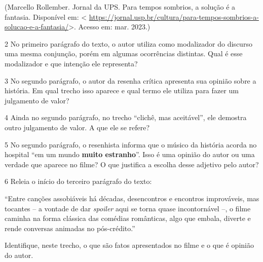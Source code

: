 (Marcello Rollember. Jornal da UPS. Para tempos sombrios, a solução é a
fantasia. Disponível em: \textless{}
\url{https://jornal.usp.br/cultura/para-tempos-sombrios-a-solucao-e-a-fantasia/}\textgreater.
Acesso em: mar. 2023.)

\num{2} No primeiro parágrafo do texto, o autor utiliza como modalizador
do discurso uma mesma conjunção, porém em algumas ocorrências distintas.
Qual é esse modalizador e que intenção ele representa?



\num{3} No segundo parágrafo, o autor da resenha crítica apresenta sua
opinião sobre a história. Em qual trecho isso aparece e qual termo ele
utiliza para fazer um julgamento de valor?



\num{4} Ainda no segundo parágrafo, no trecho ``clichê, mas aceitável'',
ele demostra outro julgamento de valor. A que ele se refere?



\num{5} No segundo parágrafo, o resenhista informa que o músico da
história acorda no hospital ``em um mundo \textbf{muito estranho}''.
Isso é uma opinião do autor ou uma verdade que aparece no filme? O que
justifica a escolha desse adjetivo pelo autor?



\num{6} Releia o início do terceiro parágrafo do texto:

``Entre canções assobiáveis há décadas, desencontros e encontros
improváveis, mas tocantes -- a vontade de dar \emph{spoiler} aqui se
torna quase incontornável --, o filme caminha na forma clássica das
comédias românticas, algo que embala, diverte e rende conversas animadas
no pós-crédito.''

Identifique, neste trecho, o que são fatos apresentados no filme e o que
é opinião do autor.


